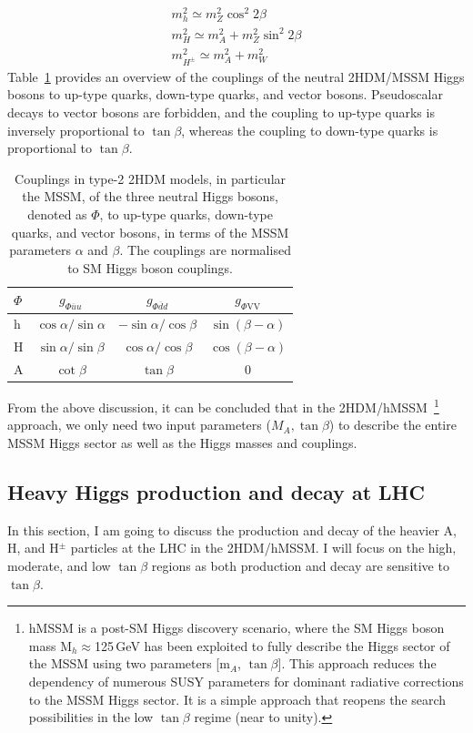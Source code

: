\begin{equation}
\begin{split}
m_{h}^{2} \simeq m_{Z}^{2}\cos^{2}2\beta \\
m_{H}^{2} \simeq m_{A}^{2} + m_{Z}^{2}\sin^{2}2\beta \\
m_{H^{\pm}}^{2} \simeq m_{A}^{2} + m_{W}^{2}
\end{split}\label{equ:alignment_limit}
\end{equation}
Table~\ref{tab1hmssm:couplings} provides an overview of the couplings of the neutral 2HDM/MSSM Higgs bosons to up-type quarks, down-type quarks, and vector bosons.
Pseudoscalar decays to vector bosons are forbidden, and the coupling to up-type quarks is inversely proportional to $\tan\beta$, whereas the coupling to down-type quarks is proportional to $\tan\beta$.
\begin{table}[h]
\centering
\begin{tabular}{l c c c}
$\Phi$  & $g_{\Phi \overline{u}u}$ & $g_{\Phi \overline{d}d}$ & $g_{\Phi\mathrm{VV}}$ \\ \hline
h       & $\cos\alpha/\sin\alpha$  & $-\sin\alpha/\cos\beta$  & $\sin(\beta-\alpha)$ \\
H   & $\sin\alpha/\sin\beta$   & $\cos\alpha/\cos\beta$   & $\cos(\beta-\alpha)$ \\
A   & $\cot\beta$              & $\tan\beta$              & 0 \\
\end{tabular}
\caption{Couplings in type-2 2HDM models, in particular the MSSM, of the three neutral Higgs bosons, denoted as $\Phi$, to up-type quarks, down-type quarks, and vector bosons, in terms of the MSSM parameters $\alpha$ and $\beta$. The couplings are normalised to SM Higgs boson couplings.\label{tab1hmssm:couplings}}
\end{table}
From the above discussion, it can be concluded that in the 2HDM/hMSSM~\footnote{hMSSM is a post-SM Higgs discovery scenario, where the SM Higgs boson mass M$_{h}\approx$125\,GeV has been exploited to fully describe the Higgs sector of the MSSM using two parameters [m$_{A}$, $\tan\beta$]. This approach reduces the dependency of numerous SUSY parameters for dominant radiative corrections to the MSSM Higgs sector. It is a simple approach that reopens the search possibilities in the low $\tan\beta$ regime (near to unity).} approach, we only need two input parameters ($M_{A}, \tan\beta$) to describe the entire MSSM Higgs sector as well as the Higgs masses and couplings.
\subsection{Heavy Higgs production and decay at LHC}\label{subsec:heavy_H_prod_decay}
In this section, I am going to discuss the production and decay of the heavier A, H, and H$^{\pm}$ particles at the LHC in the 2HDM/hMSSM. I will focus on the high, moderate, and low $\tan\beta$ regions as both production and decay are sensitive to $\tan\beta$.

